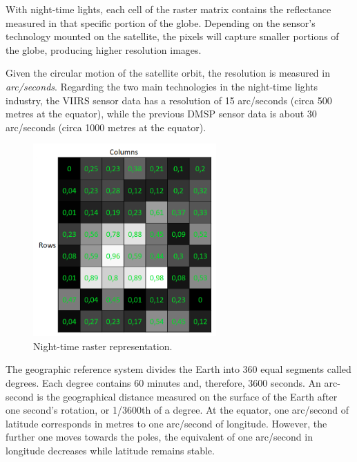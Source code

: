 With night-time lights, each cell of the raster matrix contains the reflectance measured in that specific portion of the globe.
Depending on the sensor's technology mounted on the satellite, the pixels will capture smaller portions of the globe, producing higher resolution images. 

Given the circular motion of the satellite orbit, the resolution is measured in \textit{arc/seconds}. Regarding the two main technologies in the night-time lights industry, the VIIRS sensor data has a resolution of 15 arc/seconds (circa 500 metres at the equator), while the previous DMSP sensor data is about 30 arc/seconds (circa 1000 metres at the equator). 
\begin{figure}[h]
    \begin{center}
    \includegraphics[width=7cm]{images/raster_night.png}
    \end{center}
    \caption{Night-time raster representation.}
\end{figure}
The geographic reference system divides the Earth into 360 equal segments called degrees. Each degree contains 60 minutes and, therefore, 3600 seconds.
An arc-second is the geographical distance measured on the surface of the Earth after one second's rotation, or 1/3600th of a degree.
At the equator, one arc/second of latitude corresponds in metres to one arc/second of longitude. However, the further one moves towards the poles, the equivalent of one arc/second in longitude decreases while latitude remains stable.
  
